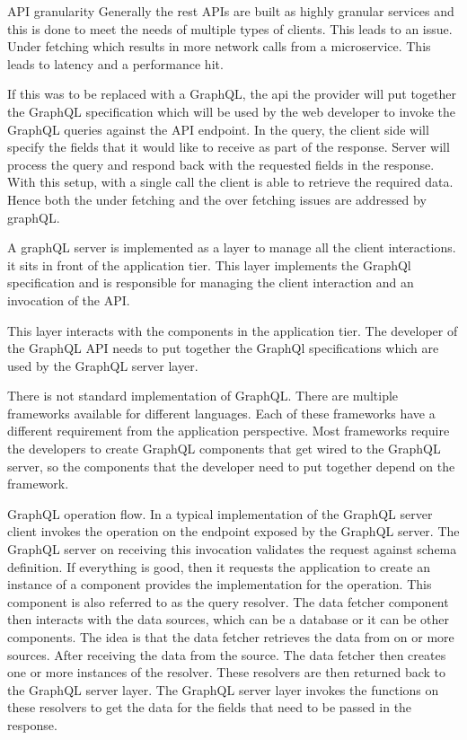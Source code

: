 API granularity
Generally the rest APIs are built as highly granular services and this is done to meet the needs of multiple types of clients.
This leads to an issue.
Under fetching which results in more network calls from a microservice. This leads to latency and a performance hit.

If this was to be replaced with a GraphQL, the api the provider will put together the GraphQL specification which will be used by the web developer to invoke the GraphQL queries against the API endpoint.
In the query, the client side will specify the fields that it would like to receive as part of the response.
Server will process the query and respond back with the requested fields in the response.
With this setup, with a single call the client is able to retrieve the required data.
Hence both the under fetching and the over fetching issues are addressed by graphQL.

A graphQL server is implemented as a layer to manage all the client interactions.
it sits in front of the application tier.
This layer implements the GraphQl specification and is responsible  for managing the client interaction and an invocation of the API.

This layer interacts with the components in the application tier.
The developer of the GraphQL API needs to put together the GraphQl specifications which are used by the GraphQL server layer.

There is not standard implementation of GraphQL.
There are multiple frameworks available for different languages.
Each of these frameworks have a different requirement from the application perspective.
Most frameworks require the developers to create GraphQL components that get wired to the GraphQL server, so the components that the developer need to put together depend on the framework.

GraphQL operation flow.
In a typical implementation of the GraphQL server client invokes the operation on the endpoint exposed by the GraphQL server.
The GraphQL server on receiving this invocation validates the request against schema definition.
If everything is good, then it requests the application to create an instance of a component provides the implementation for the operation.
This component is also referred to as the query resolver.
The data fetcher component then interacts with the data sources, which can be a database or it can be other components.
The idea is that the data fetcher retrieves the data from on or more sources.
After receiving the data from the source.
The data fetcher then creates one or more instances of the resolver.
These resolvers are then returned back to the GraphQL server layer.
The GraphQL server layer invokes the functions on these resolvers to get the data for the fields that need to be passed in the response.

